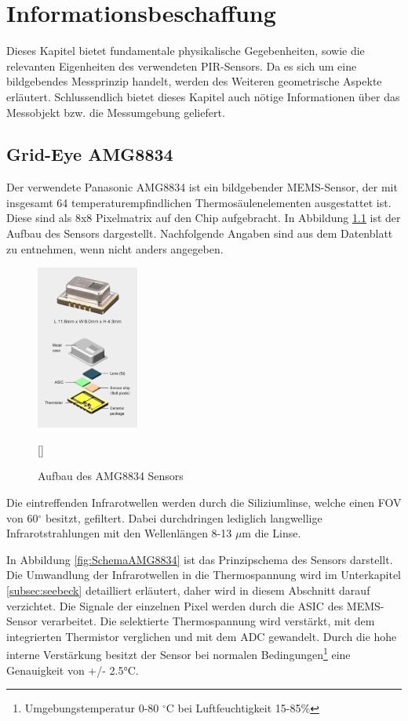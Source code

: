 \chapter{Informationsbeschaffung}
\label{chap:Informationsbeschaffung}
Dieses Kapitel bietet fundamentale physikalische Gegebenheiten, sowie die relevanten Eigenheiten des verwendeten \ac{PIR}-Sensors. Da es sich um eine bildgebendes Messprinzip handelt, werden des Weiteren geometrische Aspekte erläutert. Schlussendlich bietet dieses Kapitel auch nötige Informationen über das Messobjekt bzw. die Messumgebung geliefert.

\section{Grid-Eye AMG8834}
\label{sec:AMG8834}

Der verwendete Panasonic AMG8834 ist ein bildgebender \ac{MEMS}-Sensor, der mit insgesamt 64 temperaturempfindlichen Thermosäulenelementen ausgestattet ist. Diese sind als 8x8 Pixelmatrix auf den Chip aufgebracht. In Abbildung \ref{fig:Explosionsdarstellung} ist der Aufbau des Sensors dargestellt. Nachfolgende Angaben sind aus dem Datenblatt zu entnehmen, wenn nicht anders angegeben.
 
\begin{figure}[H]
	\centering
	\includegraphics[width=0.3\textwidth]
	{fig/grid_eye_aufbau.PNG}
	\caption[Aufbau des AMG8834 Sensors]{Aufbau des AMG8834 Sensors} [\protect\cite{AMG8834}]
	\label{fig:Explosionsdarstellung}
\end{figure}
Die eintreffenden Infrarotwellen werden durch die Siliziumlinse, welche einen \ac{FOV} von 60$^\circ$ besitzt, gefiltert. Dabei durchdringen lediglich langwellige Infrarotstrahlungen mit den Wellenlängen 8-13 $\mu$m die Linse. 

In Abbildung \ref{fig:SchemaAMG8834} ist das Prinzipschema des Sensors darstellt. Die Umwandlung der Infrarotwellen in die Thermospannung wird im Unterkapitel \ref{subsec:seebeck} detailliert erläutert, daher wird in diesem Abschnitt darauf verzichtet. Die Signale der einzelnen Pixel werden durch die \ac{ASIC} des \ac{MEMS}-Sensor verarbeitet. Die selektierte Thermospannung wird verstärkt, mit dem integrierten Thermistor verglichen und mit dem \ac{ADC} gewandelt. Durch die hohe interne Verstärkung besitzt der Sensor bei normalen Bedingungen\footnote[1]{Umgebungstemperatur 0-80 $^\circ$C bei Luftfeuchtigkeit 15-85\%} eine Genauigkeit von +/- 2.5°C. 

